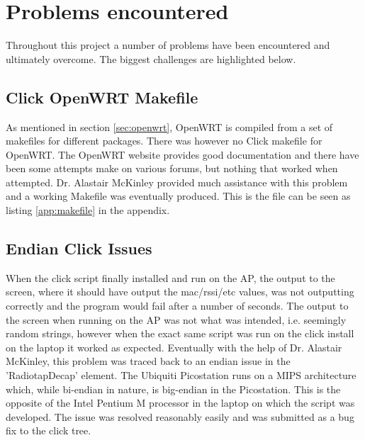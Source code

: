 \chapter{Problems encountered}

Throughout this project a number of problems have been encountered and ultimately overcome. The biggest challenges are highlighted below. 

\section{Click OpenWRT Makefile}

As mentioned in section \ref{sec:openwrt}, OpenWRT is compiled from a set of makefiles for different packages. There was however no Click makefile for OpenWRT. The OpenWRT website provides good documentation and there have been some attempts make on various forums, but nothing that worked when attempted. Dr. Alastair McKinley provided much assistance with this problem and a working Makefile was eventually produced. This is the file can be seen as listing \ref{app:makefile} in the appendix. 


\section{Endian Click Issues}

When the click script finally installed and run on the AP, the output to the screen, where it should have output the mac/rssi/etc values, was not outputting correctly and the program would fail after a number of seconds. The output to the screen when running on the AP was not what was intended, i.e. seemingly random strings, however when the exact same script was run on the click install on the laptop it worked as expected. Eventually with the help of Dr. Alastair McKinley, this problem was traced back to an endian issue in the 'RadiotapDecap' element. The Ubiquiti Picostation runs on a MIPS architecture which, while bi-endian in nature, is big-endian in the Picostation. This is the opposite of the Intel Pentium M processor in the laptop on which the script was developed. The issue was resolved reasonably easily and was submitted as a bug fix to the click tree\cite{AM}.